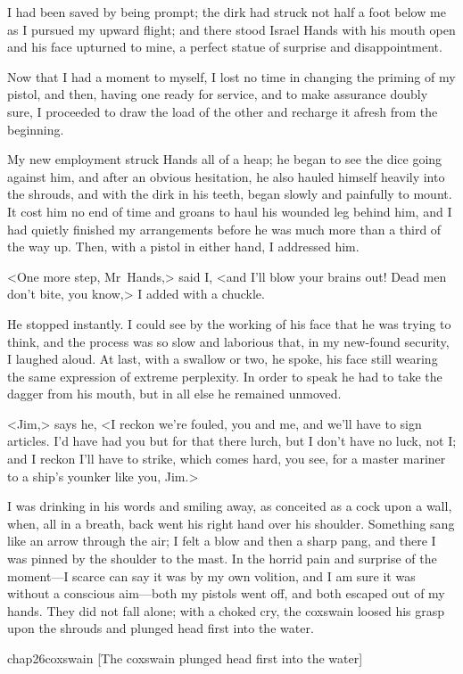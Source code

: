 I had been saved by being prompt; the dirk had struck not half a foot below me as I pursued my upward flight; and there stood Israel Hands with his mouth open and his face upturned to mine, a perfect statue of surprise and disappointment.

Now that I had a moment to myself, I lost no time in changing the priming of my pistol, and then, having one ready for service, and to make assurance doubly sure, I proceeded to draw the load of the other and recharge it afresh from the beginning.

My new employment struck Hands all of a heap; he began to see the dice going against him, and after an obvious hesitation, he also hauled himself heavily into the shrouds, and with the dirk in his teeth, began slowly and painfully to mount. It cost him no end of time and groans to haul his wounded leg behind him, and I had quietly finished my arrangements before he was much more than a third of the way up. Then, with a pistol in either hand, I addressed him.

<One more step, Mr~Hands,> said I, <and I'll blow your brains out! Dead men don't bite, you know,> I added with a chuckle.

He stopped instantly. I could see by the working of his face that he was trying to think, and the process was so slow and laborious that, in my new-found security, I laughed aloud. At last, with a swallow or two, he spoke, his face still wearing the same expression of extreme perplexity. In order to speak he had to take the dagger from his mouth, but in all else he remained unmoved.

<Jim,> says he, <I reckon we're fouled, you and me, and we'll have to sign articles. I'd have had you but for that there lurch, but I don't have no luck, not I; and I reckon I'll have to strike, which comes hard, you see, for a master mariner to a ship's younker like you, Jim.>

I was drinking in his words and smiling away, as conceited as a cock upon a wall, when, all in a breath, back went his right hand over his shoulder. Something sang like an arrow through the air; I felt a blow and then a sharp pang, and there I was pinned by the shoulder to the mast. In the horrid pain and surprise of the moment—I scarce can say it was by my own volition, and I am sure it was without a conscious aim—both my pistols went off, and both escaped out of my hands. They did not fall alone; with a choked cry, the coxswain loosed his grasp upon the shrouds and plunged head first into the water.

 
\begin{colorbigpic}
	[\basicscale]
	{chap26coxswain}
	[The coxswain plunged head first into the water]
\end{colorbigpic}
